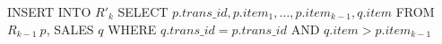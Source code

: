 INSERT INTO $R'_k$
SELECT $p.trans\_id, p.item_1, \ldots, p.item_{k-1}, q.item$
FROM $R_{k-1}\ p$, SALES $q$
WHERE $q.trans\_id = p.trans\_id$ AND
      $q.item > p.item_{k-1}$